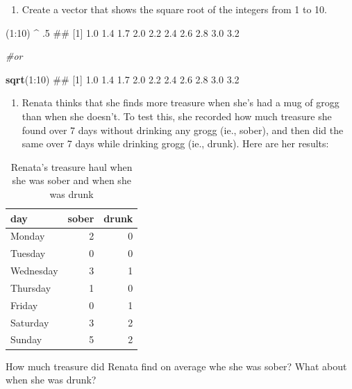 \documentclass[]{book}
\newenvironment{Shaded}{\begin{snugshade}}{\end{snugshade}}
\newcommand{\KeywordTok}[1]{\textcolor[rgb]{0.13,0.29,0.53}{\textbf{{#1}}}}
\newcommand{\DecValTok}[1]{\textcolor[rgb]{0.00,0.00,0.81}{{#1}}}
\newcommand{\StringTok}[1]{\textcolor[rgb]{0.31,0.60,0.02}{{#1}}}
\newcommand{\CommentTok}[1]{\textcolor[rgb]{0.56,0.35,0.01}{\textit{{#1}}}}
\newcommand{\NormalTok}[1]{{#1}}
\providecommand{\tightlist}{%
  \setlength{\itemsep}{0pt}\setlength{\parskip}{0pt}}
\theoremstyle{definition}
\theoremstyle{definition}
\theoremstyle{remark}
\begin{document}
\begin{enumerate}
\def\labelenumi{\arabic{enumi}.}
\tightlist
\item
  Create a vector that shows the square root of the integers from 1 to
  10.
\end{enumerate}

\begin{Shaded}
\begin{Highlighting}[]
\NormalTok{(}\DecValTok{1}\NormalTok{:}\DecValTok{10}\NormalTok{) ^}\StringTok{ }\NormalTok{.}\DecValTok{5}
\NormalTok{##  [1] 1.0 1.4 1.7 2.0 2.2 2.4 2.6 2.8 3.0 3.2}

\CommentTok{#or}

\KeywordTok{sqrt}\NormalTok{(}\DecValTok{1}\NormalTok{:}\DecValTok{10}\NormalTok{)}
\NormalTok{##  [1] 1.0 1.4 1.7 2.0 2.2 2.4 2.6 2.8 3.0 3.2}
\end{Highlighting}
\end{Shaded}

\begin{enumerate}
\def\labelenumi{\arabic{enumi}.}
\setcounter{enumi}{1}
\tightlist
\item
  Renata thinks that she finds more treasure when she's had a mug of
  grogg than when she doesn't. To test this, she recorded how much
  treasure she found over 7 days without drinking any grogg (ie.,
  sober), and then did the same over 7 days while drinking grogg (ie.,
  drunk). Here are her results:
\end{enumerate}

\begin{table}

\caption{\label{tab:unnamed-chunk-227}Renata's treasure haul when she was sober and when she was drunk}
\centering
\begin{tabular}[t]{l|r|r}
\hline
day & sober & drunk\\
\hline
Monday & 2 & 0\\
\hline
Tuesday & 0 & 0\\
\hline
Wednesday & 3 & 1\\
\hline
Thursday & 1 & 0\\
\hline
Friday & 0 & 1\\
\hline
Saturday & 3 & 2\\
\hline
Sunday & 5 & 2\\
\hline
\end{tabular}
\end{table}

How much treasure did Renata find on average whe she was sober? What
about when she was drunk?
\end{document}
